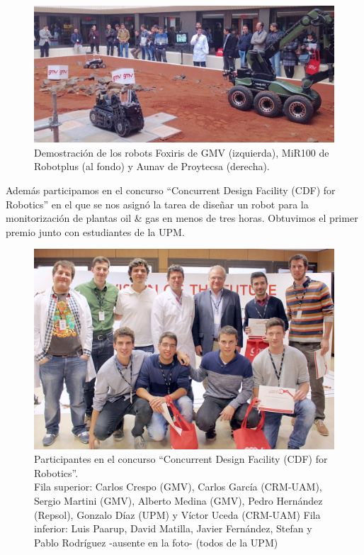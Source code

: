 \documentclass[12pt,twoside]{report}
\begin{document}
\begin{figure}[hbtp]
\centerline{\includegraphics[width=0.8\linewidth]{fotos/2015_V_JornadaRobotica_GMV}}
\caption*{
Demostración de los robots Foxiris de GMV (izquierda), MiR100 de Robotplus (al fondo) y Aunav de Proytecsa (derecha).
}
\end{figure}

Además participamos en el concurso ``Concurrent Design Facility (CDF) for Robotics'' en el que se nos asignó la tarea de diseñar un robot para la monitorización de plantas oil \& gas en menos de tres horas. Obtuvimos el primer premio junto con estudiantes de la UPM.


\begin{figure}[hbtp]
\centerline{\includegraphics[width=0.8\linewidth]{fotos/2015_V_JornadaRobotica_GMV_team}}
\caption*{
Participantes en el concurso ``Concurrent Design Facility (CDF) for Robotics''. \\
Fila superior: Carlos Crespo (GMV), Carlos García (CRM-UAM), Sergio Martini (GMV), Alberto Medina (GMV), Pedro Hernández (Repsol), Gonzalo Díaz (UPM) y Víctor Uceda (CRM-UAM)
Fila inferior: Luis Paarup, David Matilla, Javier Fernández, Stefan y Pablo Rodríguez -ausente en la foto- (todos de la UPM)
}
\end{figure}
\end{document}

